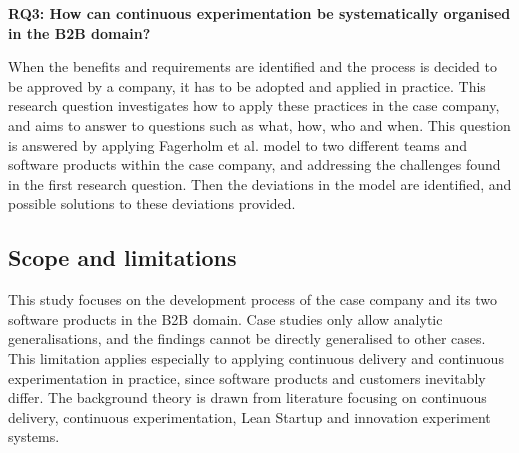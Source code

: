 \documentclass[english]{tktltiki2}
\theoremstyle{definition}
\theoremstyle{remark}
\begin{document}



\noindent \textbf{RQ3: How can continuous experimentation be systematically organised in the B2B domain?}

\noindent When the benefits and requirements are identified and the process is decided to be approved by a company, it has to be adopted and applied in practice. This research question investigates how to apply these practices in the case company, and aims to answer to questions such as what, how, who and when. This question is answered by applying Fagerholm et al. model \cite{fagerholm2014building} to two different teams and software products within the case company, and addressing the challenges found in the first research question. Then the deviations in the model are identified, and possible solutions to these deviations provided. \newline

\subsection{Scope and limitations}
This study focuses on the development process of the case company and its two software products in the B2B domain. Case studies only allow analytic generalisations, and the findings cannot be directly generalised to other cases. This limitation applies especially to applying continuous delivery and continuous experimentation in practice, since software products and customers inevitably differ. The background theory is drawn from literature focusing on continuous delivery, continuous experimentation, Lean Startup and innovation experiment systems. 
\end{document}
